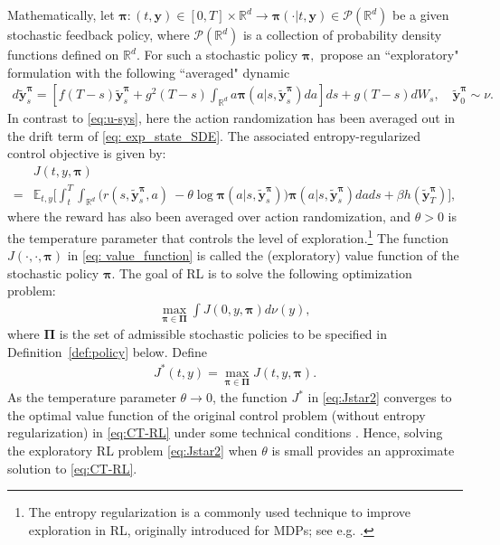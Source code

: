 \documentclass[11pt]{article}
\newcommand{\bpi}{\boldsymbol{\pi}}
\newcommand{\bPi}{\boldsymbol{\Pi}}
\begin{document}
Mathematically, let $\bpi: (t,\mathbf{y}) \in [0,T] \times \mathbb{R}^d \rightarrow  \bpi (\cdot| t, \mathbf{y}) \in \mathcal{P} (\mathbb{R}^d)$ be a given stochastic feedback policy, where $\mathcal{P} (\mathbb{R}^d)$ is a collection of probability density functions defined on $\mathbb{R}^d$.
For such a stochastic policy $\bpi,$  \cite{Wang20,jia2023q} propose  an ``exploratory" formulation with the following ``averaged" dynamic
        \begin{align}\label{eq: exp_state_SDE}
        d \tilde {\mathbf{y}}^{\bpi}_s= \left[f(T- s) \tilde{\mathbf{y}}^{\bpi}_{s} +g^2(T-s) {\int_{\mathbb{R}^d} a {\bpi}(a|s, \tilde {\mathbf{y}}^{\bpi}_s ) da} \right]  ds + g(T-s)  dW_s  , \quad \tilde{\mathbf{y}}_{0}^{\bpi} \sim\nu.
    \end{align}
In contrast to \eqref{eq:u-sys}, here the action randomization has been averaged out in the drift term of \eqref{eq: exp_state_SDE}.
The associated entropy-regularized control objective is given by:
\begin{align} \label{eq: value_function}
        &J(t, y, \bpi) \nonumber\\
        = &\mathbb{E}_{t,y}\bigg[  \int_t^T \int_{\mathbb{R}^d} \big( {r(s, \tilde{\mathbf{y}}_s^{\bpi}, a)}\ - { \theta \log \bpi(a|s, \tilde{\mathbf{y}}_{s}^{\bpi})\big) \bpi(a|s, \tilde{\mathbf{y}}_{s}^{\bpi}) da} ds + {\beta h(\tilde{\mathbf{y}}_T^{\bpi} )}\bigg],
    \end{align}
    where the reward has also been averaged over action randomization, and
    $\theta>0$ is the temperature parameter that controls the level of exploration.\footnote{The entropy regularization is a commonly used technique to improve exploration in RL, originally introduced for MDPs; see e.g. \cite{haarnoja2018soft}.}
    The function $J(\cdot, \cdot, \bpi)$ in \eqref{eq: value_function} is called the (exploratory) value function of the stochastic policy $\bpi$. The goal of RL is to solve the following optimization problem: 
\begin{align*} %
	\max_{\bpi \in \bPi} \int J(0, y, \bpi) d \nu(y),
\end{align*}
where $\boldsymbol{\Pi}$ is the set of admissible stochastic policies to be specified  in Definition~\ref{def:policy} below. Define
\begin{align}\label{eq:Jstar2}
J^*(t, y) =	\max_{\bpi \in \bPi} J(t, y, \bpi).
\end{align}
As the temperature parameter $\theta \rightarrow 0$,
the function $J^*$ in \eqref{eq:Jstar2} converges to the optimal value function of the original control problem (without entropy regularization) in \eqref{eq:CT-RL} under some technical conditions \citep{tang2022exploratory}. Hence, solving the exploratory RL problem \eqref{eq:Jstar2} when $\theta$ is small provides an approximate solution to \eqref{eq:CT-RL}. %
\end{document}
